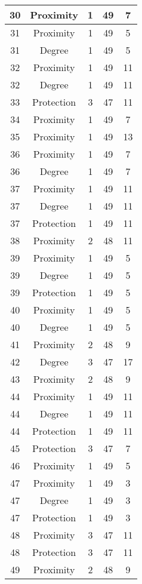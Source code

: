 \documentclass[results.tex]{subfiles}
\begin{document}
\begin{center}
\begin{tabular}{| c || c | c | c | c |}
    \hline
    30 & Proximity & 1 & 49 & 7 \\ 
    \hline
    31 & Proximity & 1 & 49 & 5 \\ 
    \hline
    31 & Degree & 1 & 49 & 5 \\ 
    \hline
    32 & Proximity & 1 & 49 & 11 \\ 
    \hline
    32 & Degree & 1 & 49 & 11 \\ 
    \hline
    33 & Protection & 3 & 47 & 11 \\ 
    \hline
    34 & Proximity & 1 & 49 & 7 \\ 
    \hline
    35 & Proximity & 1 & 49 & 13 \\ 
    \hline
    36 & Proximity & 1 & 49 & 7 \\ 
    \hline
    36 & Degree & 1 & 49 & 7 \\ 
    \hline
    37 & Proximity & 1 & 49 & 11 \\ 
    \hline
    37 & Degree & 1 & 49 & 11 \\ 
    \hline
    37 & Protection & 1 & 49 & 11 \\ 
    \hline
    38 & Proximity & 2 & 48 & 11 \\ 
    \hline
    39 & Proximity & 1 & 49 & 5 \\ 
    \hline
    39 & Degree & 1 & 49 & 5 \\ 
    \hline
    39 & Protection & 1 & 49 & 5 \\ 
    \hline
    40 & Proximity & 1 & 49 & 5 \\ 
    \hline
    40 & Degree & 1 & 49 & 5 \\ 
    \hline
    41 & Proximity & 2 & 48 & 9 \\ 
    \hline
    42 & Degree & 3 & 47 & 17 \\ 
    \hline
    43 & Proximity & 2 & 48 & 9 \\ 
    \hline
    44 & Proximity & 1 & 49 & 11 \\ 
    \hline
    44 & Degree & 1 & 49 & 11 \\ 
    \hline
    44 & Protection & 1 & 49 & 11 \\ 
    \hline
    45 & Protection & 3 & 47 & 7 \\ 
    \hline
    46 & Proximity & 1 & 49 & 5 \\ 
    \hline
    47 & Proximity & 1 & 49 & 3 \\ 
    \hline
    47 & Degree & 1 & 49 & 3 \\ 
    \hline
    47 & Protection & 1 & 49 & 3 \\ 
    \hline
    48 & Proximity & 3 & 47 & 11 \\ 
    \hline
    48 & Protection & 3 & 47 & 11 \\ 
    \hline
    49 & Proximity & 2 & 48 & 9 \\ 
    \hline   \end{tabular}
\end{center}
\end{document}
